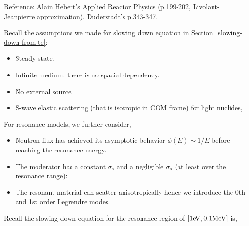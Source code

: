 \documentclass{school-22.211-notes}
\date{February 29, 2012}
\begin{document}
\maketitle




\clearpage
{}
Reference: Alain Hebert's Applied Reactor Physics (p.199-202, Livolant-Jeanpierre approximation), Duderstadt's p.343-347. 

Recall the assumptions we made for slowing down equation in Section~\ref{slowing-down-from-te}: 
\begin{itemize}
\item Steady state.
\item Infinite medium: there is no spacial dependency. 
\item No external source. 
\item S-wave elastic scattering (that is isotropic in COM frame) for light nuclides, 
\end{itemize}

For resonance models, we further consider, 
\begin{itemize}
\item Neutron flux has achieved its asymptotic behavior $\phi(E) \sim 1/E$ before reaching the resonance energy. 
\item The moderator has a constant $\sigma_s$ and a negligible $\sigma_a$ (at least over the resonance range): 
\item The resonant material can scatter anisotropically hence we introduce the 0th and 1st order Legrendre modes. 
\end{itemize}

Recall the slowing down equation for the resonance region of $[1\mathrm{eV}, 0.1 \mathrm{MeV}]$ is, 
\end{document}
